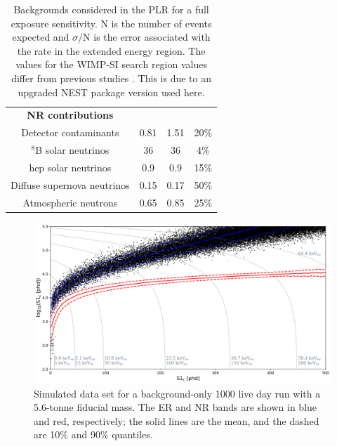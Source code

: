 \begin{table}[]
\begin{tabular}{c|c|c|c}
        \textbf{NR contributions}                    &                        &                         &   \\
        Detector contaminants                        & 0.81                   & 1.51                    & 20\% \cite{LZ_projected_sensitivity_paper_ref}         \\
        ${}^{8}$B solar neutrinos                    & 36                     & 36                      & 4\%  \cite{b8_neutrino_rate_ref}       \\
        hep solar neutrinos                          & 0.9                    & 0.9                     & 15\% \cite{solar_neutrinos_rate_ref, pp_solar_neutrinos_rate_ref}        \\
        Diffuse supernova neutrinos                  & 0.15                   & 0.17                    & 50\% \cite{dissuse_supernova_neutrinos_rate_ref}        \\
        Atmospheric neutrons                         & 0.65                   & 0.85                    & 25\% \cite{atmospheric_neutrinos_rate_ref}      
    \end{tabular}
    \caption{Backgrounds considered in the PLR for a full exposure sensitivity. N is the number of events expected and $\sigma$/N is the error associated with the rate in the extended energy region.
    The values for the WIMP-SI search region values differ from previous studies \cite{LZ_projected_sensitivity_paper_ref,LZ_Ibles_LZStats_Thesis_ref}. This is due to an upgraded NEST package version used here.}
    \label{tab:projected_lz_backgrounds}
\end{table}



\begin{figure}
    \centering
    \includegraphics[width=15cm]{Figures/EFT/Projected_backgrounds/projected_backgrounds_s1_s2.png}
    \caption{Simulated data set for a background-only 1000 live day run with a 5.6-tonne fiducial mass. The ER and NR bands are shown in blue and red, respectively; the solid lines are the mean, and the dashed are 10\% and 90\% quantiles.}
    \label{fig:projected_background_dataset}
\end{figure}

